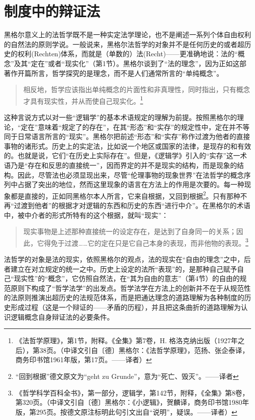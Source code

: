 \chapter{制度中的辩证法}

黑格尔意义上的法哲学既不是一种实定法学理论，也不是阐述一系列个体自由权利的自然法的原则学说。一般说来，黑格尔法哲学的对象并不是任何历史的或者超历史的权利(Rechten)体系，而就是（单数的）法(Recht)——更准确地说：法的“概念”及其“定在”或者“现实化”（第1节）。黑格尔谈到了“法的理念”，因为正如这部著作开篇所言，哲学探究的是理念，而不是人们通常所言的“单纯概念”。

\begin{quote}
相反地，哲学应该指出单纯概念的片面性和非真理性，同时指出，只有概念才具有现实性，并从而使自己现实化。\footnote{《法哲学原理》，第1节，附释。《全集》第7卷，H. 格洛克纳出版（1927年之后），第38页。（中译文引自〔德〕黑格尔：《法哲学原理》，范扬、张企泰译，商务印书馆1961年版，第17页。——译者）}
\end{quote}

这种言说方式以对一些“逻辑学”的基本术语规定的理解为前提。按照黑格尔的理论，“定在”意味着“规定了的存在”，在其“形态”和“实存”的规定性中，定在并不等同于日常语言所言的“现实”。黑格尔把前述“形态”和“实存”称作过渡为他者的直接事物的诸形式。历史上的实定法，比如说一个地区或国家的法律，是现存的和有效的。也就是说，它们“在历史上实际存在”。但是，《逻辑学》引入的“实存”这一术语乃是“存在和反思的直接统一”，因而界定的并不是现实的结构，而是现象的结构。因此，尽管法也必须显现出来，尽管“伦理事物的现象世界”在法哲学的概念序列中占据了突出的地位，然而这里现象的语言在方法上的作用是次要的。每一种现象都是直接的，正如同黑格尔本人所言，它来自根据，又回到根据\footnote{“回到根据”德文原文为“geht zu Grunde”，意为“死亡、毁灭”。——译者}。只有那种不再“过渡到他者”的根据才对逻辑的东西和历史的东西“进行中介”。在黑格尔的术语中，被中介者的形式所特有的这个根据，就叫“现实”：

\begin{quote}
现实事物是上述那种直接统一的设定存在，是达到了自身同一的关系；因此，它得免于过渡……它的定在只是它自己本身的表现，而非他物的表现。\footnote{《哲学科学百科全书》，第一部分，逻辑学，第142节，附释，《全集》第8卷，第320页。（中译文引自〔德〕黑格尔：《小逻辑》，贺麟译，商务印书馆1980年版，第295页。按德文原注标明此句引文出自“说明”，疑误。——译者）}
\end{quote}

法哲学的对象是法的现实，依照黑格尔的观点，法的现实在“自由的理念”之中，后者建立在对立规定的统一之中。历史上设定的法所“表现”的，是那种自己赋予自己“现实性”的“概念”，它仿照自然法，在“其为自由的意志”（第4节）的自由的规范原则下构成了“哲学法学”的出发点。哲学法学在方法上的创新并不在于从规范性的法原则推演出超历史的法规范体系，而是把通达理念的道路理解为各种制度的历史形成过程（这是一个辩证的——矛盾的历程），并且把这条曲折的道路理解为认识逻辑概念自身辩证法的必要条件。

